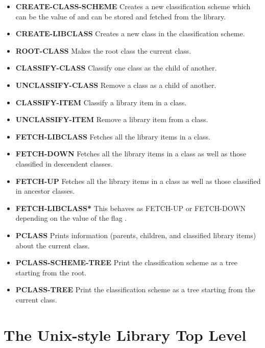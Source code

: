 \begin{itemize}
\item {\bf CREATE-CLASS-SCHEME}  Creates a new classification scheme
which can be the value of 
and can be stored and fetched from the library.

\item {\bf CREATE-LIBCLASS}  Creates a new class in the classification scheme.

\item {\bf ROOT-CLASS}  Makes the root class the current class.

\item {\bf CLASSIFY-CLASS}  Classify one class as the child of another.

\item {\bf UNCLASSIFY-CLASS}  Remove a class as a child of another.

\item {\bf CLASSIFY-ITEM}  Classify a library item in a class.

\item {\bf UNCLASSIFY-ITEM}  Remove a library item from a class.

\item {\bf FETCH-LIBCLASS}  Fetches all the library items in a class.

\item {\bf FETCH-DOWN}  Fetches all the library items in a class
as well as those classified in descendent classes.

\item {\bf FETCH-UP}  Fetches all the library items in a class
as well as those classified in ancestor classes.

\item {\bf FETCH-LIBCLASS*}  This behaves as FETCH-UP or FETCH-DOWN
depending on the value of the flag .

\item {\bf PCLASS}  Prints information (parents, children,
and classified library items) about the current class.

\item {\bf PCLASS-SCHEME-TREE}  Print the classification scheme as a tree
starting from the root.

\item {\bf PCLASS-TREE}  Print the classification scheme as a tree starting
from the current class.
\end{itemize}

\section{The Unix-style Library Top Level}

